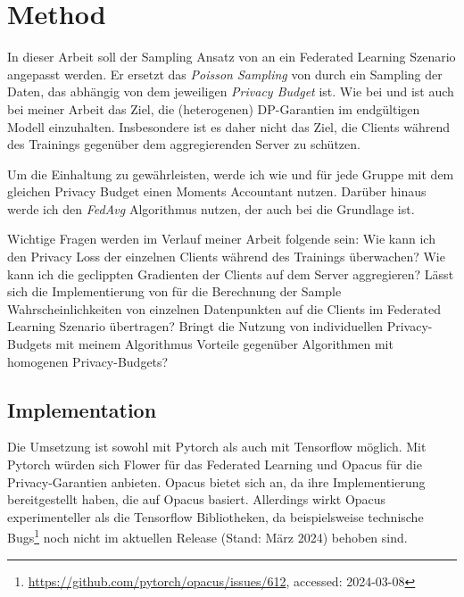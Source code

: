 \section{Method}

In dieser Arbeit soll der Sampling Ansatz von \textcite{boenisch:2023} an ein Federated Learning Szenario angepasst werden. Er ersetzt das \textit{Poisson Sampling} von \textcite{abadi:2016} durch ein Sampling der Daten, das abhängig von dem jeweiligen \textit{Privacy Budget} ist. Wie bei \textcite{aldaghri:2023} und \textcite{mcmahan:2018} ist auch bei meiner Arbeit das Ziel, die (heterogenen) DP-Garantien im endgültigen Modell einzuhalten. Insbesondere ist es daher nicht das Ziel, die Clients während des Trainings gegenüber dem aggregierenden Server zu schützen.

Um die Einhaltung zu gewährleisten, werde ich wie \textcite{boenisch:2023} und \textcite{aldaghri:2023} für jede Gruppe mit dem gleichen Privacy Budget einen Moments Accountant nutzen. Darüber hinaus werde ich den \textit{FedAvg} Algorithmus nutzen, der auch bei \textcite{aldaghri:2023} die Grundlage ist.

Wichtige Fragen werden im Verlauf meiner Arbeit folgende sein: Wie kann ich den Privacy Loss der einzelnen Clients während des Trainings überwachen? Wie kann ich die geclippten Gradienten der Clients auf dem Server aggregieren? Lässt sich die Implementierung von \textcite{boenisch:2023} für die Berechnung der Sample Wahrscheinlichkeiten von einzelnen Datenpunkten auf die Clients im Federated Learning Szenario übertragen? Bringt die Nutzung von individuellen Privacy-Budgets mit meinem Algorithmus Vorteile gegenüber Algorithmen mit homogenen Privacy-Budgets?

\subsection{Implementation}
Die Umsetzung ist sowohl mit Pytorch als auch mit Tensorflow möglich. Mit Pytorch würden sich Flower \parencite{beutel:2020} für das Federated Learning und Opacus \parencite{yousefpour:2021} für die Privacy-Garantien anbieten. Opacus bietet sich an, da \textcite{boenisch:2023} ihre Implementierung bereitgestellt haben, die auf Opacus basiert. Allerdings wirkt Opacus experimenteller als die Tensorflow Bibliotheken, da beispielsweise technische Bugs\footnote{\url{https://github.com/pytorch/opacus/issues/612}, accessed: 2024-03-08} noch nicht im aktuellen Release (Stand: März 2024) behoben sind. 

